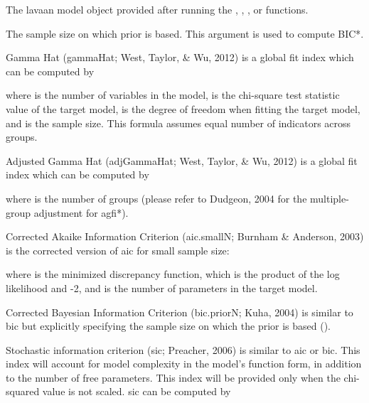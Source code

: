 \documentclass[a4paper]{book}
\begin{document}
%
\begin{Arguments}
\begin{ldescription}
\item[\code{object}] The lavaan model object provided after running the , , , or  functions.
\item[\code{nPrior}] The sample size on which prior is based. This argument is used to compute BIC*.
\end{ldescription}
\end{Arguments}
%
\begin{Details}\relax
Gamma Hat (gammaHat; West, Taylor, \& Wu, 2012) is a global fit index which can be computed by


where  is the number of variables in the model,  is the chi-square test statistic value of the target model,  is the degree of freedom when fitting the target model, and  is the sample size. This formula assumes equal number of indicators across groups.

Adjusted Gamma Hat (adjGammaHat; West, Taylor, \& Wu, 2012) is a global fit index which can be computed by


where  is the number of groups (please refer to Dudgeon, 2004 for the multiple-group adjustment for agfi*).

Corrected Akaike Information Criterion (aic.smallN; Burnham \& Anderson, 2003) is the corrected version of aic for small sample size:


where  is the minimized discrepancy function, which is the product of the log likelihood and -2, and  is the number of parameters in the target model.

Corrected Bayesian Information Criterion (bic.priorN; Kuha, 2004) is similar to bic but explicitly specifying the sample size on which the prior is based ().


Stochastic information criterion (sic; Preacher, 2006) is similar to aic or bic. This index will account for model complexity in the model's function form, in addition to the number of free parameters. This index will be provided only when the chi-squared value is not scaled. sic can be computed by


\end{Details}
\end{document}
